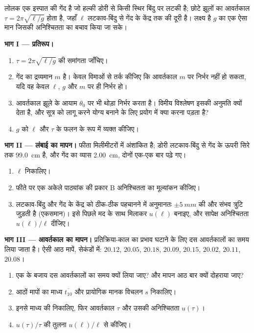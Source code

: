 \begin{problem}
\label{pb:b1:units-dimensions:1}
लोलक एक इस्पात की गेंद है जो हल्की डोरी से किसी स्थिर बिंदु पर लटकी है; छोटे
झूलों का आवर्तकाल $\tau = 2\pi\sqrt{\ell/g}$ होता है, जहाँ $\ell$ लटकाव-बिंदु
से गेंद के केंद्र तक की दूरी है। लक्ष्य है $g$ का एक ऐसा मान जिसकी
अनिश्चितता का बचाव किया जा सके।

\medskip
\noindent\textbf{भाग I --- प्रतिरूप।}
\begin{enumerate}
  \item $\tau = 2\pi\sqrt{\ell/g}$ की समांगता जाँचिए।
  \item गेंद का द्रव्यमान $m$ है। केवल विमाओं से तर्क कीजिए कि आवर्तकाल $m$
        पर निर्भर नहीं हो सकता, यदि वह केवल $\ell$, $g$ और $m$ पर ही निर्भर
        हो।
  \item आवर्तकाल झूले के आयाम $\theta_0$ पर भी थोड़ा निर्भर करता है। विमीय
        विश्लेषण इसकी अनुमति क्यों देता है, और सूत्र को लागू करने योग्य बनाने
        के लिए प्रयोग में क्या करना पड़ता है?
  \item $g$ को $\ell$ और $\tau$ के फलन के रूप में व्यक्त कीजिए।
\end{enumerate}

\medskip
\noindent\textbf{भाग II --- लंबाई का मापन।}
फीता मिलीमीटरों में अंशांकित है; डोरी लटकाव-बिंदु से गेंद के ऊपरी सिरे तक
\qty{99.0}{cm} है, और गेंद का व्यास \qty{2.00}{cm}, दोनों एक-एक बार पढ़े गए।
\begin{enumerate}[resume]
  \item $\ell$ निकालिए।
  \item फीते पर एक अकेले पाठ्यांक की प्रकार B अनिश्चितता का मूल्यांकन
        कीजिए।
  \item लटकाव-बिंदु और गेंद के केंद्र को ठीक-ठीक पहचानने में अनुमानतः
        $\pm\qty{5}{mm}$ की और संभव त्रुटि जुड़ती है (एकसमान)। इसे पिछले
        मद के साथ मिलाकर $u(\ell)$ बनाइए, और सापेक्ष अनिश्चितता
        $u(\ell)/\ell$ दीजिए।
\end{enumerate}

\medskip
\noindent\textbf{भाग III --- आवर्तकाल का मापन।}
प्रतिक्रिया-काल का प्रभाव घटाने के लिए दस आवर्तकालों का समय लिया जाता है।
ऐसी आठ मापें, सेकंडों में: $20.12$, $20.05$, $20.18$, $20.09$, $20.15$,
$20.02$, $20.11$, $20.08$।
\begin{enumerate}[resume]
  \item एक के बजाय दस आवर्तकालों का समय क्यों लिया जाए? और मापन आठ बार क्यों
        दोहराया जाए?
  \item आठों मापों का माध्य $\overline{t_{10}}$ और प्रायोगिक मानक विचलन $s$
        निकालिए।
  \item इनसे माध्य की  निकालिए, फिर आवर्तकाल $\tau$ और उसकी
        अनिश्चितता $u(\tau)$।
  \item $u(\tau)/\tau$ की तुलना $u(\ell)/\ell$ से कीजिए।
\end{enumerate}


\end{problem}
